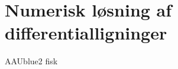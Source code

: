 \chapter{Numerisk løsning af differentialligninger}
%
\begin{color}{AAUblue2}
%
fisk
% 
\end{color}





